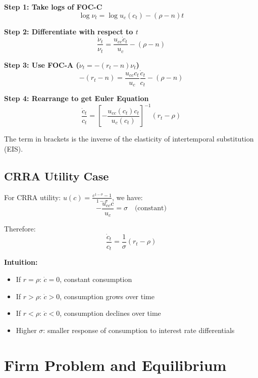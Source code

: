 \documentclass[a4paper,11pt]{article}
\begin{document}
\begin{derivationbox}
\textbf{Step 1: Take logs of FOC-C}
\[
\log \nu_t = \log u_c(c_t) - (\rho - n)t
\]

\textbf{Step 2: Differentiate with respect to $t$}
\[
\frac{\dot{\nu}_t}{\nu_t} = \frac{u_{cc} \dot{c}_t}{u_c} - (\rho - n)
\]

\textbf{Step 3: Use FOC-A ($\dot{\nu}_t = -(r_t - n)\nu_t$)}
\[
-(r_t - n) = \frac{u_{cc} c_t}{u_c} \frac{\dot{c}_t}{c_t} - (\rho - n)
\]

\textbf{Step 4: Rearrange to get Euler Equation}
\[
\frac{\dot{c}_t}{c_t} = \left[ -\frac{u_{cc}(c_t) c_t}{u_c(c_t)} \right]^{-1} (r_t - \rho)
\tag{Euler-General}
\]
\end{derivationbox}

The term in brackets is the inverse of the elasticity of intertemporal substitution (EIS).

\subsection*{CRRA Utility Case}

\begin{resultbox}
For CRRA utility: $u(c) = \frac{c^{1-\sigma} - 1}{1-\sigma}$, we have:
\[
-\frac{u_{cc} c}{u_c} = \sigma \quad \text{(constant)}
\]

Therefore:
\[
\boxed{\frac{\dot{c}_t}{c_t} = \frac{1}{\sigma}(r_t - \rho)}
\tag{Euler-CRRA}
\]
\end{resultbox}

\textbf{Intuition:}
\begin{itemize}
    \item If $r = \rho$: $\dot{c} = 0$, constant consumption
    \item If $r > \rho$: $\dot{c} > 0$, consumption grows over time
    \item If $r < \rho$: $\dot{c} < 0$, consumption declines over time
    \item Higher $\sigma$: smaller response of consumption to interest rate differentials
\end{itemize}

\section{Firm Problem and Equilibrium}
\end{document}
